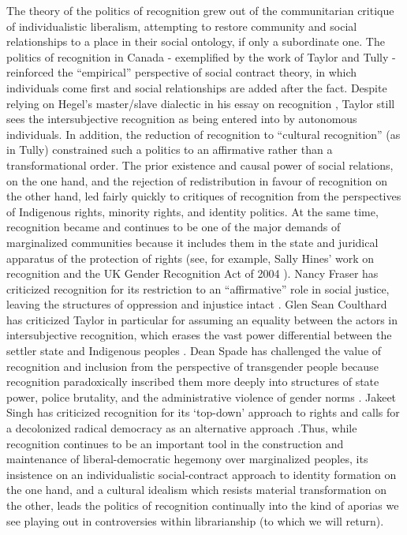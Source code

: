 \documentclass[12pt,oneside]{memoir}
\begin{document}
The theory of the politics of recognition grew out of the communitarian critique of individualistic liberalism, attempting to restore community and social relationships to a place in their social ontology, if only a subordinate one. The politics of recognition in Canada - exemplified by the work of Taylor and Tully - reinforced the ``empirical'' perspective of social contract theory, in which individuals come first and social relationships are added after the fact. Despite relying on Hegel's master/slave dialectic in his essay on recognition \citep{Taylor1994}, Taylor still sees the intersubjective recognition as being entered into by autonomous individuals. In addition, the reduction of recognition to ``cultural recognition'' (as in Tully) constrained such a politics to an affirmative rather than a transformational order.
The prior existence and causal power of social relations, on the one hand, and the rejection of redistribution in favour of recognition on the other hand, led fairly quickly to critiques of recognition from the perspectives of Indigenous rights, minority rights, and identity politics. At the same time, recognition became and continues to be one of the major demands of marginalized communities because it includes them in the state and juridical apparatus of the protection of rights (see, for example, Sally Hines' work on recognition and the UK Gender Recognition Act of 2004 \citep{Hines2013}). Nancy Fraser has criticized recognition for its restriction to an ``affirmative'' role in social justice, leaving the structures of oppression and injustice intact \citep{Fraser1997, fraser-honneth}. Glen Sean Coulthard has criticized Taylor in particular for assuming an equality between the actors in intersubjective recognition, which erases the vast power differential between the settler state and Indigenous peoples \citep{coulthard2014}. Dean Spade has challenged the value of recognition and inclusion from the perspective of transgender people because recognition paradoxically inscribed them more deeply into structures of state power, police brutality, and the administrative violence of gender norms \citep{Spade2015}. Jakeet Singh has criticized recognition for its `top-down' approach to rights \citep{singh-recognition} and calls for a decolonized radical democracy as an alternative approach \citep{singh-democracy}.Thus, while recognition continues to be an important tool in the construction and maintenance of liberal-democratic hegemony over marginalized peoples, its insistence on an individualistic social-contract approach to identity formation on the one hand, and a cultural idealism which resists material transformation on the other, leads the politics of recognition continually into the kind of aporias we see playing out in controversies within librarianship (to which we will return).
\end{document}
